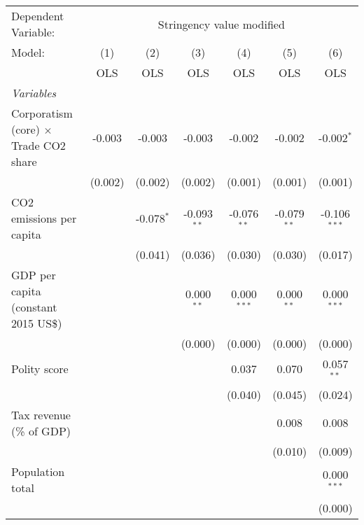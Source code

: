 
\begingroup
\centering
\begin{tabular}{lcccccc}
   \toprule
   Dependent Variable: & \multicolumn{6}{c}{Stringency value modified}\\
   Model:                                       & (1)     & (2)          & (3)           & (4)           & (5)           & (6)\\  
                                                &  OLS    & OLS          & OLS           & OLS           & OLS           & OLS\\  
   \midrule
   \emph{Variables}\\
   Corporatism (core) $\times$ Trade CO2 share  & -0.003  & -0.003       & -0.003        & -0.002        & -0.002        & -0.002$^{*}$\\   
                                                & (0.002) & (0.002)      & (0.002)       & (0.001)       & (0.001)       & (0.001)\\   
   CO2 emissions per capita                     &         & -0.078$^{*}$ & -0.093$^{**}$ & -0.076$^{**}$ & -0.079$^{**}$ & -0.106$^{***}$\\   
                                                &         & (0.041)      & (0.036)       & (0.030)       & (0.030)       & (0.017)\\   
   GDP per capita (constant 2015 US\$)          &         &              & 0.000$^{**}$  & 0.000$^{***}$ & 0.000$^{**}$  & 0.000$^{***}$\\   
                                                &         &              & (0.000)       & (0.000)       & (0.000)       & (0.000)\\   
   Polity score                                 &         &              &               & 0.037         & 0.070         & 0.057$^{**}$\\   
                                                &         &              &               & (0.040)       & (0.045)       & (0.024)\\   
   Tax revenue (\% of GDP)                      &         &              &               &               & 0.008         & 0.008\\   
                                                &         &              &               &               & (0.010)       & (0.009)\\   
   Population total                             &         &              &               &               &               & 0.000$^{***}$\\   
                                                &         &              &               &               &               & (0.000)\\   

\end{tabular}
